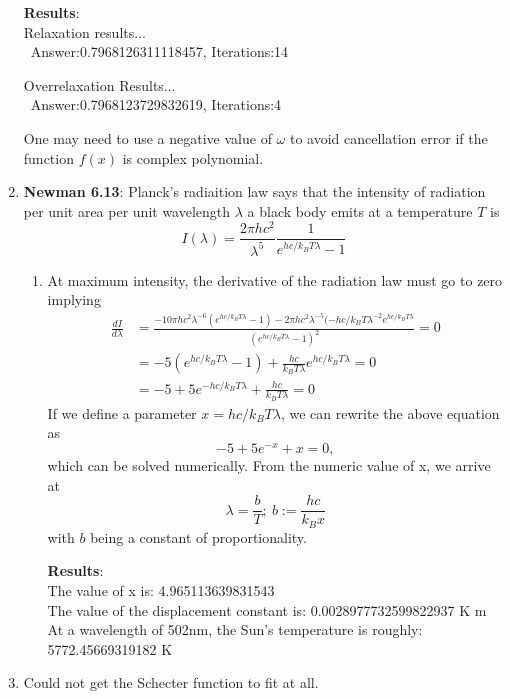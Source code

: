 \documentclass{article}
\begin{document}
\begin{enumerate}
{    \textbf{Results}:\\
    
    Relaxation results...\\\
    Answer:0.7968126311118457, Iterations:14

    Overrelaxation Results...\\\
    Answer:0.7968123729832619, Iterations:4
    
    One may need to use a negative value of $\omega$ to avoid cancellation error if the function $f(x)$ is complex polynomial.
    }
    \item {\textbf{Newman 6.13}:
    Planck's radiaition law says that the intensity of radiation per unit area per unit wavelength $\lambda$ a black body emits at a temperature $T$ is
    \begin{equation*}
        I(\lambda) = \frac{2\pi hc^2}{\lambda^5}\frac{1}{e^{hc/k_BT\lambda} - 1}
    \end{equation*}
    \begin{enumerate}
        \item {At maximum intensity, the derivative of the radiation law must go to zero implying
        \begin{equation*}
        \begin{split}
            \frac{dI}{d\lambda} &= \frac{-10\pi h c^2 \lambda^{-6}(e^{hc/k_BT\lambda} - 1) - 2\pi hc^2\lambda^{-5}(-hc/k_BT\lambda^{-2}e^{hc/k_BT\lambda}}{(e^{hc/k_BT\lambda} - 1)^2} = 0\\
            &=  -5(e^{hc/k_BT\lambda} - 1) +\frac{hc}{k_BT\lambda}e^{hc/k_BT\lambda} = 0\\
            &= -5 +5e^{-hc/k_BT\lambda} + \frac{hc}{k_BT\lambda} = 0
        \end{split}
        \end{equation*}
        If we define a parameter $x= hc/k_BT\lambda$, we can rewrite the above equation as
        \begin{equation*}
            -5 +5e^{-x} + x = 0,
        \end{equation*}
        which can be solved numerically. From the numeric value of x, we arrive at
        \begin{equation}
            \lambda = \frac{b}{T}; \ b:= \frac{hc}{k_Bx}
        \end{equation}
        with $b$ being a constant of proportionality.
        
        \textbf{Results}:\\
        The value of x is: 4.965113639831543\\
        The value of the displacement constant is: 0.0028977732599822937 K m\\
        
        At a wavelength of 502nm, the Sun's temperature is roughly: 5772.45669319182 K
}
    \end{enumerate}
    }
    \item {Could not get the Schecter function to
    fit at all.
    }
\end{enumerate}
\end{document}
